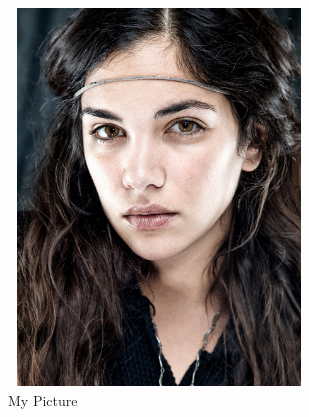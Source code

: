 \documentclass{book}
\begin{document}
\begin{figure}
\centering
  \includegraphics[width=8cm,height=10cm]{../graphics/amato}%
  \caption{My Picture}
\end{figure}
\end{document}
